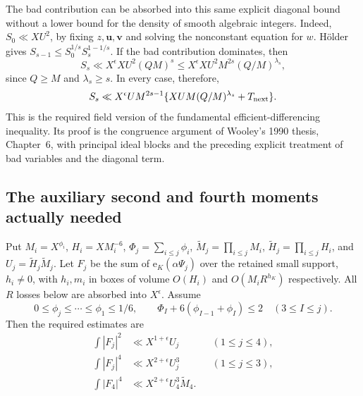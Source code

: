 \documentclass[11pt,reqno]{amsart}
\numberwithin{equation}{section}
\theoremstyle{definition}
\begin{document}
The bad contribution can be absorbed into this same explicit diagonal bound
without a lower bound for the density of smooth algebraic integers.
Indeed, $S_0\ll XU^2$, by fixing $z,\mathbf u,\mathbf v$ and solving the
nonconstant equation for $w$.  H\"older gives
$S_{s-1}\le S_0^{1/s}S_s^{1-1/s}$.
If the bad contribution dominates, then
\[
 S_s\ll X^\epsilon XU^2(QM)^s
 \le X^\epsilon XU^2M^{2s}(Q/M)^{\lambda_s},
\]
since $Q\ge M$ and $\lambda_s\ge s$.
In every case, therefore,
\begin{equation}\label{eq:g6-fundamental}
 S_s\ll X^\epsilon U M^{2s-1}
 \{XUM(Q/M)^{\lambda_s}+T_{\rm next}\}.
\end{equation}
This is the required field version of the fundamental efficient-differencing
inequality.  Its proof is the congruence argument of Wooley's 1990 thesis,
Chapter~6, with principal ideal blocks and the preceding explicit treatment
of bad variables and the diagonal term.

\subsection{The auxiliary second and fourth moments actually needed}

Put $M_i=X^{\phi_i}$, $H_i=XM_i^{-6}$,
$\Phi_j=\sum_{i\le j}\phi_i$,
$\widetilde M_j=\prod_{i\le j}M_i$,
$\widetilde H_j=\prod_{i\le j}H_i$, and $U_j=\widetilde H_j\widetilde M_j$.
Let $F_j$ be the sum of $\mathrm e_K(\alpha\Psi_j)$ over the retained small
support, $h_i\ne0$, with $h_i,m_i$ in boxes of volume $O(H_i)$ and
$O(M_iR^{h_K})$ respectively.  All $R$ losses below are absorbed into $X^\epsilon$.
Assume
\begin{equation}\label{eq:g6-parameters}
 0\le\phi_j\le\cdots\le\phi_1\le1/6,
 \qquad \Phi_I+6(\phi_{I-1}+\phi_I)\le2\quad(3\le I\le j).
\end{equation}
Then the required estimates are
\begin{align}
 \int|F_j|^2&\ll X^{1+\epsilon}U_j &&(1\le j\le4),\label{eq:g6-aux2}\\
 \int|F_j|^4&\ll X^{2+\epsilon}U_j^3 &&(1\le j\le3),\label{eq:g6-aux4}\\
 \int|F_4|^4&\ll X^{2+\epsilon}U_4^3\widetilde M_4.\label{eq:g6-aux4special}
\end{align}
\end{document}
